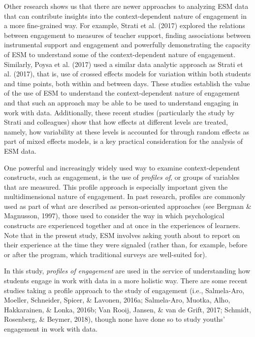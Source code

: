 \documentclass[]{msu-thesis}
\theoremstyle{definition}
\theoremstyle{definition}
\theoremstyle{definition}
\theoremstyle{remark}
\begin{document}
Other research shows us that there are newer approaches to analyzing ESM
data that can contribute insights into the context-dependent nature of
engagement in a more fine-grained way. For example, Strati et al. (2017)
explored the relations between engagement to measures of teacher
support, finding associations between instrumental support and
engagement and powerfully demonstrating the capacity of ESM to
understand some of the context-dependent nature of engagement.
Similarly, Poysa et al. (2017) used a similar data analytic approach as
Strati et al. (2017), that is, use of crossed effects models for
variation within both students and time points, both within and between
days. These studies establish the value of the use of ESM to understand
the context-dependent nature of engagement and that such an approach may
be able to be used to understand engaging in work with data.
Additionally, these recent studies (particularly the study by Strati and
colleagues) show that how effects at different levels are treated,
namely, how variability at these levels is accounted for through random
effects as part of mixed effects models, is a key practical
consideration for the analysis of ESM data.

One powerful and increasingly widely used way to examine
context-dependent constructs, such as engagement, is the use of
\emph{profiles of}, or groups of variables that are measured. This
profile approach is especially important given the multidimensional
nature of engagement. In past research, profiles are commonly used as
part of what are described as person-oriented approaches (see Bergman \&
Magnusson, 1997), those used to consider the way in which psychological
constructs are experienced together and at once in the experiences of
learners. Note that in the present study, ESM involves asking youth
about to report on their experience at the time they were signaled
(rather than, for example, before or after the program, which
traditional surveys are well-suited for).

In this study, \emph{profiles of engagement} are used in the service of
understanding how students engage in work with data in a more holistic
way. There are some recent studies taking a profile approach to the
study of engagement (i.e., Salmela-Aro, Moeller, Schneider, Spicer, \&
Lavonen, 2016a; Salmela-Aro, Muotka, Alho, Hakkarainen, \& Lonka, 2016b;
Van Rooij, Jansen, \& van de Grift, 2017; Schmidt, Rosenberg, \& Beymer,
2018), though none have done so to study youths' engagement in work with
data.
\end{document}
